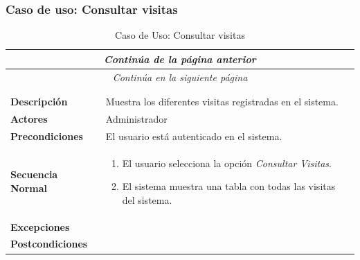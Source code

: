 \newpage
\subsubsection*{Caso de uso: Consultar visitas }
\begin{longtable}{| p{4cm} | p{10cm} |}
\endfirsthead
\multicolumn{2}{c}{\textit{Continúa de la página anterior}}\\[12pt]
\hline
\endhead
\hline
\multicolumn{2}{c}{\textit{Continúa en la siguiente página}} \\
\endfoot
\hline
\caption{Caso de Uso: Consultar visitas}\label{fig:1}\\
\endlastfoot


\hline
\multicolumn{2}{|c|}{\textbf{CU$<$30$>$ - Consultar Visitas}} \\

\hline
\textbf{Descripción} &
Muestra los diferentes visitas registradas en el sistema.\\

\hline
\textbf{Actores} &
Administrador\\

\hline
\textbf{Precondiciones} &
El usuario está autenticado en el sistema.\\

\hline
\textbf{Secuencia Normal} &\mbox{}\par\vspace{-\baselineskip}
\begin{enumerate}[leftmargin=0.7cm, topsep=0.1cm]
\item El usuario selecciona la opción \textit{Consultar Visitas}.
\item El sistema muestra una tabla con todas las visitas del sistema.
\end{enumerate}


\\
\hline
\textbf{Excepciones} &\mbox{}\par\vspace{-\baselineskip}
\\

\hline
\textbf{Postcondiciones} & \\
\hline
\end{longtable}



\newpage
